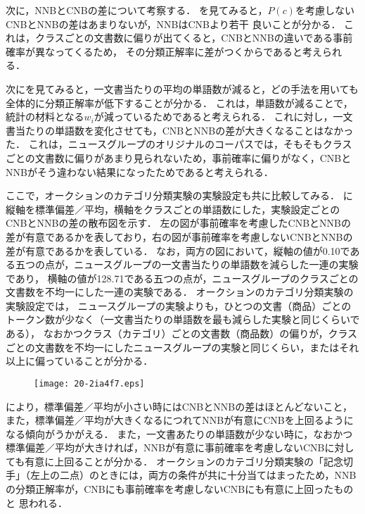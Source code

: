 \documentclass[japanese]{jnlp_1.4}
\newcommand{\figref}[1]{}
\begin{document}
次に，NNBとCNBの差について考察する．
\figref{Fig:標準偏差／平均}を見てみると，$P(c)$を考慮しないCNBとNNBの差はあまりないが，NNBはCNBより若干
良いことが分かる．
これは，クラスごとの文書数に偏りが出てくると，CNBとNNBの違いである事前確率が異なってくるため，
その分類正解率に差がつくからであると考えられる．

次に\figref{Fig:1文書ごとに平均した単語数}を見てみると，一文書当たりの平均の単語数が減ると，どの手法を用いても全体的に分類正解率が低下することが分かる．
これは，単語数が減ることで，統計の材料となる$w_i$が減っているためであると考えられる．
これに対し，一文書当たりの単語数を変化させても，CNBとNNBの差が大きくなることはなかった．
これは，ニュースグループのオリジナルのコーパスでは，そもそもクラスごとの文書数に偏りがあまり見られないため，事前確率に偏りがなく，CNBとNNBがそう違わない結果になったためであると考えられる．

ここで，オークションのカテゴリ分類実験の実験設定も共に比較してみる．
\figref{Fig:CNBとNNB}に縦軸を標準偏差／平均，横軸をクラスごとの単語数にした，実験設定ごとのCNBとNNBの差の散布図を示す．
左の図が事前確率を考慮したCNBとNNBの差が有意であるかを表しており，右の図が事前確率を考慮しないCNBとNNBの差が有意であるかを表している．
なお，両方の図において，縦軸の値が0.10である五つの点が，ニュースグループの一文書当たりの単語数を減らした一連の実験であり，
横軸の値が128.71である五つの点が，ニュースグループのクラスごとの文書数を不均一にした一連の実験である．
オークションのカテゴリ分類実験の実験設定では，
ニュースグループの実験よりも，ひとつの文書（商品）ごとのトークン数が少なく（一文書当たりの単語数を最も減らした実験と同じくらいである），
なおかつクラス（カテゴリ）ごとの文書数（商品数）の偏りが，クラスごとの文書数を不均一にしたニュースグループの実験と同じくらい，またはそれ以上に偏っていることが分かる．

\begin{figure}[t]
\begin{center}
\texttt{[image: 20-2ia4f7.eps]}
\end{center}
\label{Fig:CNBとNNB}
\end{figure}

\figref{Fig:CNBとNNB}により，標準偏差／平均が小さい時にはCNBとNNBの差はほとんどないこと，また，標準偏差／平均が大きくなるにつれてNNBが有意にCNBを上回るようになる傾向がうかがえる．
また，一文書あたりの単語数が少ない時に，なおかつ標準偏差／平均が大きければ，NNBが有意に事前確率を考慮しないCNBに対しても有意に上回ることが分かる．
オークションのカテゴリ分類実験の「記念切手」（左上の二点）のときには，両方の条件が共に十分当てはまったため，NNBの分類正解率が，CNBにも事前確率を考慮しないCNBにも有意に上回ったものと
思われる．
\end{document}
